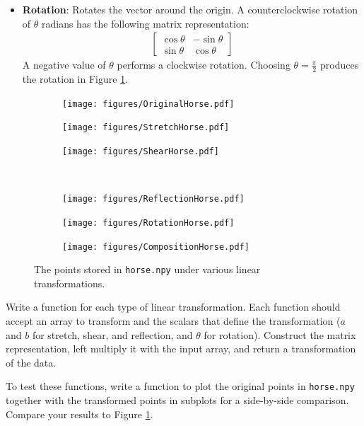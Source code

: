 \begin{itemize}
\item \textbf{Rotation}: %
Rotates the vector around the origin.
A counterclockwise rotation of $\theta$ radians has the following matrix representation:
%
\begin{align*}
\left[\begin{array}{rr}
\cos\theta & -\sin\theta\\
\sin\theta &  \cos\theta
\end{array}\right]
\end{align*}
%
A negative value of $\theta$ performs a clockwise rotation.
Choosing $\theta = \frac{\pi}{2}$ produces the rotation in Figure \ref{fig:linearly-transformed-horses}.

\end{itemize}

\begin{figure}[H] %
\captionsetup[subfigure]{justification=centering}
\centering
\begin{subfigure}{.32\textwidth}
    \centering
    \texttt{[image: figures/OriginalHorse.pdf]}
\end{subfigure}
%
\begin{subfigure}{.32\textwidth}
    \centering
    \texttt{[image: figures/StretchHorse.pdf]}
\end{subfigure}
%
\begin{subfigure}{.32\textwidth}
    \centering
    \texttt{[image: figures/ShearHorse.pdf]}
\end{subfigure}
\\
\begin{subfigure}{.32\textwidth}
    \centering
    \texttt{[image: figures/ReflectionHorse.pdf]}
\end{subfigure}
%
\begin{subfigure}{.32\textwidth}
    \centering
    \texttt{[image: figures/RotationHorse.pdf]}
\end{subfigure}
%
\begin{subfigure}{.32\textwidth}
    \centering
    \texttt{[image: figures/CompositionHorse.pdf]}
\end{subfigure}
\caption{The points stored in \texttt{horse.npy} under various linear transformations.}
\label{fig:linearly-transformed-horses}
\end{figure}


\begin{problem} %
Write a function for each type of linear transformation.
Each function should accept an array to transform and the scalars that define the transformation ($a$ and $b$ for stretch, shear, and reflection, and $\theta$ for rotation).
Construct the matrix representation, left multiply it with the input array, and return a transformation of the data.

To test these functions, write a function to plot the original points in
\texttt{horse.npy} together with the transformed points in subplots for a side-by-side comparison.
Compare your results to Figure \ref{fig:linearly-transformed-horses}.
\label{prob:implement-linear-transformations}
\end{problem}

